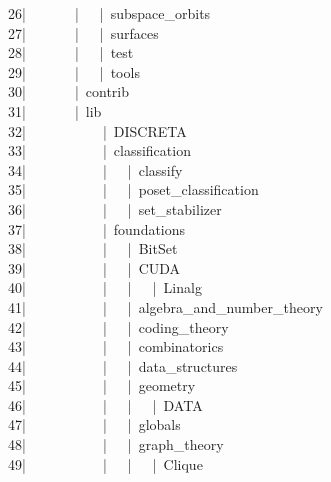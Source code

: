 \begin{tabbing}
26\>|  \ \ \ \ \ |  \ |\ subspace\_orbits\\[0pt]
27\>|  \ \ \ \ \ |  \ |\ surfaces\\[0pt]
28\>|  \ \ \ \ \ |  \ |\ test\\[0pt]
29\>|  \ \ \ \ \ |  \ |\ tools\\[0pt]
30\>|  \ \ \ \ \ |\ contrib\\[0pt]
31\>|  \ \ \ \ \ |\ lib\\[0pt]
32\>|  \ \ \ \ \ \ \ \ \ |\ DISCRETA\\[0pt]
33\>|  \ \ \ \ \ \ \ \ \ |\ classification\\[0pt]
34\>|  \ \ \ \ \ \ \ \ \ |  \ |\ classify\\[0pt]
35\>|  \ \ \ \ \ \ \ \ \ |  \ |\ poset\_classification\\[0pt]
36\>|  \ \ \ \ \ \ \ \ \ |  \ |\ set\_stabilizer\\[0pt]
37\>|  \ \ \ \ \ \ \ \ \ |\ foundations\\[0pt]
38\>|  \ \ \ \ \ \ \ \ \ |  \ |\ BitSet\\[0pt]
39\>|  \ \ \ \ \ \ \ \ \ |  \ |\ CUDA\\[0pt]
40\>|  \ \ \ \ \ \ \ \ \ |  \ |  \ |\ Linalg\\[0pt]
41\>|  \ \ \ \ \ \ \ \ \ |  \ |\ algebra\_and\_number\_theory\\[0pt]
42\>|  \ \ \ \ \ \ \ \ \ |  \ |\ coding\_theory\\[0pt]
43\>|  \ \ \ \ \ \ \ \ \ |  \ |\ combinatorics\\[0pt]
44\>|  \ \ \ \ \ \ \ \ \ |  \ |\ data\_structures\\[0pt]
45\>|  \ \ \ \ \ \ \ \ \ |  \ |\ geometry\\[0pt]
46\>|  \ \ \ \ \ \ \ \ \ |  \ |  \ |\ DATA\\[0pt]
47\>|  \ \ \ \ \ \ \ \ \ |  \ |\ globals\\[0pt]
48\>|  \ \ \ \ \ \ \ \ \ |  \ |\ graph\_theory\\[0pt]
49\>|  \ \ \ \ \ \ \ \ \ |  \ |  \ |\ Clique\\[0pt]

\end{tabbing}
